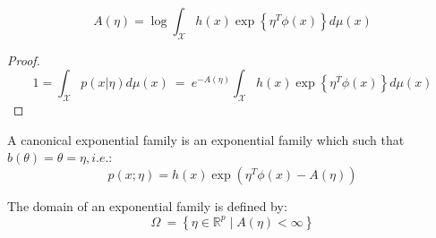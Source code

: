 \documentclass[12pt]{report}
\begin{document}
\begin{proposition}
\label{expression of A}
$$A(\eta) = \log  \int_{ \mathcal{X}  } h(x)\exp  \left\lbrace \eta^T \phi(x)\right\rbrace d\mu (x)$$
\end{proposition}

\begin{proof} 
$$ 1 = \int_{ \mathcal{X} } p(x|\eta) d\mu (x) \: = \:  e^{-A(\eta)}\int_{ \mathcal{X}  } h(x)\exp  \left\lbrace \eta^T \phi(x)\right\rbrace d\mu (x) $$
\end{proof}

\begin{definition}
A canonical exponential family is an exponential family which such that $b(\theta)=\theta=\eta, i.e.$:
$$p(x;\eta)=h(x) \exp(\eta^T \phi(x)-A(\eta))$$
\end{definition}

\begin{definition}[Domain] The domain of an exponential family is defined by:
$$\Omega\: = \left\lbrace \eta \in \mathbb{R}^p \mid A(\eta) < \infty \right\rbrace  $$
\end{definition}
\end{document}
